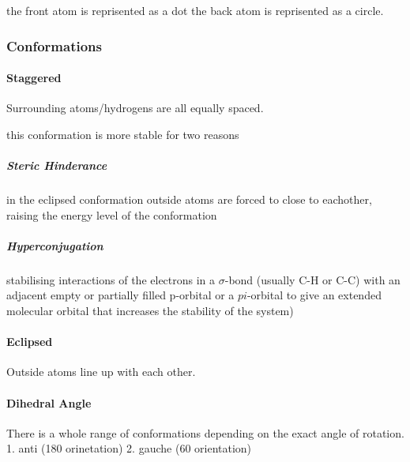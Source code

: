 \documentclass[]{article}
\let\oldparagraph\paragraph
\renewcommand{\paragraph}[1]{\oldparagraph{#1}\mbox{}}
\let\oldsubparagraph\subparagraph
\renewcommand{\subparagraph}[1]{\oldsubparagraph{#1}\mbox{}}
\begin{document}
the front atom is reprisented as a dot the back atom is reprisented as a
circle.

\hypertarget{conformations}{%
\subsubsection{Conformations}\label{conformations}}

\hypertarget{staggered}{%
\paragraph{Staggered}\label{staggered}}

Surrounding atoms/hydrogens are all equally spaced.

this conformation is more stable for two reasons

\hypertarget{steric-hinderance}{%
\subparagraph{Steric Hinderance}\label{steric-hinderance}}

in the eclipsed conformation outside atoms are forced to close to
eachother, raising the energy level of the conformation

\hypertarget{hyperconjugation}{%
\subparagraph{Hyperconjugation}\label{hyperconjugation}}

stabilising interactions of the electrons in a \(\sigma\)-bond (usually
C-H or C-C) with an adjacent empty or partially filled p-orbital or a
\(pi\)-orbital to give an extended molecular orbital that increases the
stability of the system)

\hypertarget{eclipsed}{%
\paragraph{Eclipsed}\label{eclipsed}}

Outside atoms line up with each other.

\hypertarget{dihedral-angle}{%
\paragraph{Dihedral Angle}\label{dihedral-angle}}

There is a whole range of conformations depending on the exact angle of
rotation. 1. anti (180 orinetation) 2. gauche (60 orientation)
\end{document}
